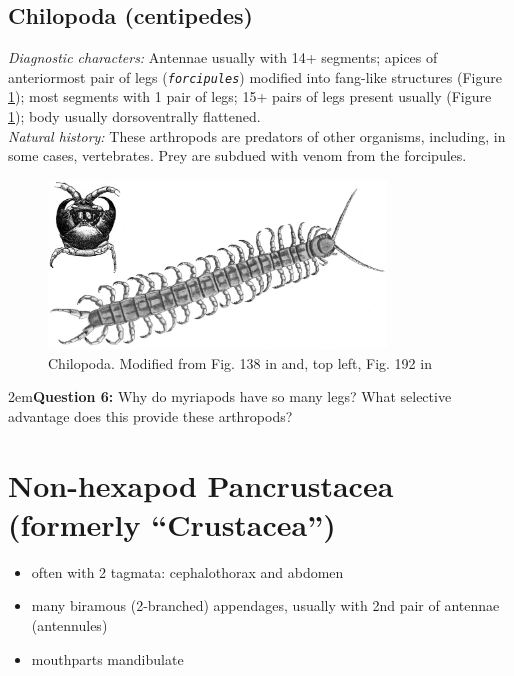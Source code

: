 \documentclass[letterpaper, 11pt]{article}
\newcommand{\latinword}[1]{\texttt{\itshape #1}}%
\begin{document}
\subsection{Chilopoda (centipedes)}
\noindent{}\textit{Diagnostic characters:} Antennae usually with 14+ segments; apices of anteriormost pair of legs (\latinword{forcipules}) modified into fang-like structures (Figure \ref{fig:chilo2}); most segments with 1 pair of legs; 15+ pairs of legs present usually (Figure \ref{fig:chilo2}); body usually dorsoventrally flattened.\\

\noindent{}\textit{Natural history:} These arthropods are predators of other organisms, including, in some cases, vertebrates. Prey are subdued with venom from the forcipules.\\

\begin{figure}[ht!]
	\centering
        \includegraphics[width=0.8\textwidth]{chilopod}
        \caption{Chilopoda. Modified from Fig. 138 in \cite{bhlitem91180chilopod} and, top left, Fig. 192 in \cite{bhlitem117775chilo2}}
        \label{fig:chilo2}
\end{figure}

\hangindent2em\textbf{Question 6:} Why do myriapods have so many legs? What selective advantage does this provide these arthropods? \vspace{4cm}

\section{Non-hexapod Pancrustacea (formerly ``Crustacea'')}
\begin{itemize}
\item often with 2 tagmata: cephalothorax and abdomen
\item many biramous (2-branched) appendages, usually with 2nd pair of antennae (antennules)
\item mouthparts mandibulate
\end{itemize}
\end{document}
